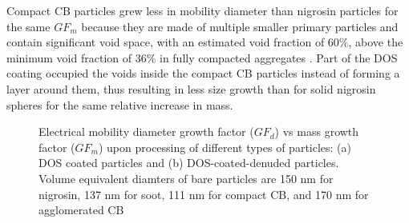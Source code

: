 Compact CB particles grew less in mobility diameter than nigrosin particles for the same $GF_m$ because they are made of multiple smaller primary particles and contain significant void space, with an estimated void fraction of $60\%$, above the minimum void fraction of 36\% in fully compacted aggregates \citep{RN18}. Part of the DOS coating occupied the voids inside the compact CB particles instead of forming a layer around them, thus resulting in less size growth than for solid nigrosin spheres for the same relative increase in mass.

\begin{figure}[htp]
    \centering
    \caption{Electrical mobility diameter growth factor ($GF_d$) vs mass growth factor ($GF_{ m}$) upon processing of different types of particles: (a) DOS coated particles and (b) DOS-coated-denuded particles. Volume equivalent diamters of bare particles are 150 nm for nigrosin, 137 nm for soot, 111 nm for compact CB, and 170 nm for agglomerated CB}
    \label{fig:gfd}
\end{figure}

